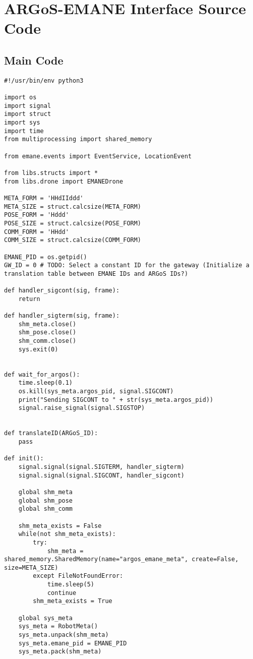 \chapter{ARGoS-EMANE Interface Source Code}
\section{Main Code}
\begin{verbatim}
#!/usr/bin/env python3

import os
import signal
import struct
import sys
import time
from multiprocessing import shared_memory

from emane.events import EventService, LocationEvent

from libs.structs import *
from libs.drone import EMANEDrone

META_FORM = 'HHdIIddd'
META_SIZE = struct.calcsize(META_FORM)
POSE_FORM = 'Hddd'
POSE_SIZE = struct.calcsize(POSE_FORM)
COMM_FORM = 'HHdd'
COMM_SIZE = struct.calcsize(COMM_FORM)

EMANE_PID = os.getpid()
GW_ID = 0 # TODO: Select a constant ID for the gateway (Initialize a translation table between EMANE IDs and ARGoS IDs?)

def handler_sigcont(sig, frame):
    return

def handler_sigterm(sig, frame):
    shm_meta.close()
    shm_pose.close()
    shm_comm.close()
    sys.exit(0)


def wait_for_argos():
    time.sleep(0.1)
    os.kill(sys_meta.argos_pid, signal.SIGCONT)
    print("Sending SIGCONT to " + str(sys_meta.argos_pid))
    signal.raise_signal(signal.SIGSTOP)


def translateID(ARGoS_ID):
    pass

def init():
    signal.signal(signal.SIGTERM, handler_sigterm)
    signal.signal(signal.SIGCONT, handler_sigcont)

    global shm_meta
    global shm_pose
    global shm_comm

    shm_meta_exists = False
    while(not shm_meta_exists):
        try:
            shm_meta = shared_memory.SharedMemory(name="argos_emane_meta", create=False, size=META_SIZE)
        except FileNotFoundError:
            time.sleep(5)
            continue
        shm_meta_exists = True

    global sys_meta
    sys_meta = RobotMeta()
    sys_meta.unpack(shm_meta)
    sys_meta.emane_pid = EMANE_PID
    sys_meta.pack(shm_meta)


\end{verbatim}
